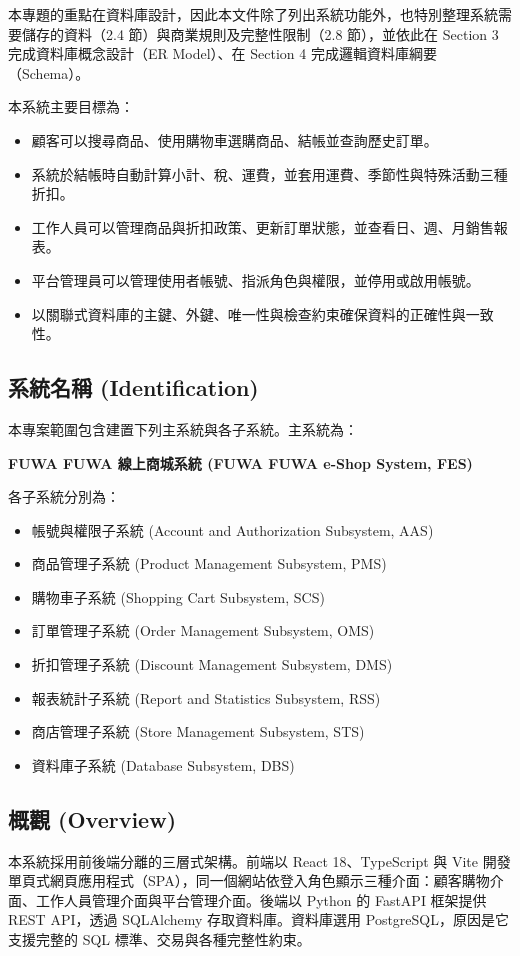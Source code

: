 \documentclass[12pt,a4paper]{article}
\begin{document}
本專題的重點在資料庫設計，因此本文件除了列出系統功能外，也特別整理系統需要儲存的資料（2.4 節）與商業規則及完整性限制（2.8 節），並依此在 Section 3 完成資料庫概念設計（ER Model）、在 Section 4 完成邏輯資料庫綱要（Schema）。

本系統主要目標為：
\begin{itemize}
  \item 顧客可以搜尋商品、使用購物車選購商品、結帳並查詢歷史訂單。
  \item 系統於結帳時自動計算小計、稅、運費，並套用運費、季節性與特殊活動三種折扣。
  \item 工作人員可以管理商品與折扣政策、更新訂單狀態，並查看日、週、月銷售報表。
  \item 平台管理員可以管理使用者帳號、指派角色與權限，並停用或啟用帳號。
  \item 以關聯式資料庫的主鍵、外鍵、唯一性與檢查約束確保資料的正確性與一致性。
\end{itemize}

\subsection{系統名稱 (Identification)}
本專案範圍包含建置下列主系統與各子系統。主系統為：

\textbf{FUWA FUWA 線上商城系統 (FUWA FUWA e-Shop System, FES)}

各子系統分別為：
\begin{itemize}
  \item 帳號與權限子系統 (Account and Authorization Subsystem, AAS)
  \item 商品管理子系統 (Product Management Subsystem, PMS)
  \item 購物車子系統 (Shopping Cart Subsystem, SCS)
  \item 訂單管理子系統 (Order Management Subsystem, OMS)
  \item 折扣管理子系統 (Discount Management Subsystem, DMS)
  \item 報表統計子系統 (Report and Statistics Subsystem, RSS)
  \item 商店管理子系統 (Store Management Subsystem, STS)
  \item 資料庫子系統 (Database Subsystem, DBS)
\end{itemize}

\subsection{概觀 (Overview)}
本系統採用前後端分離的三層式架構。前端以 React 18、TypeScript 與 Vite 開發單頁式網頁應用程式（SPA），同一個網站依登入角色顯示三種介面：顧客購物介面、工作人員管理介面與平台管理介面。後端以 Python 的 FastAPI 框架提供 REST API，透過 SQLAlchemy 存取資料庫。資料庫選用 PostgreSQL，原因是它支援完整的 SQL 標準、交易與各種完整性約束。
\end{document}

